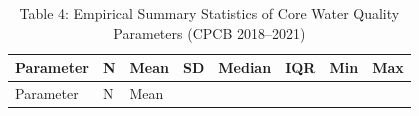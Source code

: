 \documentclass[
]{article}
\begin{document}
\begin{longtable}[]{@{}
  >{\raggedright\arraybackslash}p{}
  >{\raggedleft\arraybackslash}p{}
  >{\raggedleft\arraybackslash}p{}
  >{\raggedleft\arraybackslash}p{}
  >{\raggedleft\arraybackslash}p{}
  >{\raggedleft\arraybackslash}p{}
  >{\raggedleft\arraybackslash}p{}
  >{\raggedleft\arraybackslash}p{}@{}}
\caption{Table 4: Empirical Summary Statistics of Core Water Quality
Parameters (CPCB 2018--2021)}\tabularnewline
\toprule\noalign{}
\begin{minipage}[b]{\linewidth}\raggedright
Parameter
\end{minipage} & \begin{minipage}[b]{\linewidth}\raggedleft
N
\end{minipage} & \begin{minipage}[b]{\linewidth}\raggedleft
Mean
\end{minipage} & \begin{minipage}[b]{\linewidth}\raggedleft
SD
\end{minipage} & \begin{minipage}[b]{\linewidth}\raggedleft
Median
\end{minipage} & \begin{minipage}[b]{\linewidth}\raggedleft
IQR
\end{minipage} & \begin{minipage}[b]{\linewidth}\raggedleft
Min
\end{minipage} & \begin{minipage}[b]{\linewidth}\raggedleft
Max
\end{minipage} \\
\midrule\noalign{}
\endfirsthead
\toprule\noalign{}
\begin{minipage}[b]{\linewidth}\raggedright
Parameter
\end{minipage} & \begin{minipage}[b]{\linewidth}\raggedleft
N
\end{minipage} & \begin{minipage}[b]{\linewidth}\raggedleft
Mean
\end{minipage} & \begin{minipage}[b]{\linewidth}\raggedleft

\end{minipage}
\end{longtable}
\end{document}
